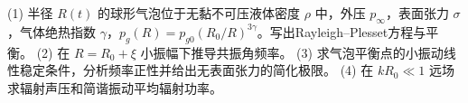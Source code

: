 (1) 半径 \(R(t)\) 的球形气泡位于无黏不可压液体密度 \(\rho\) 中，外压 \(p_\infty\)，表面张力 \(\sigma\)，气体绝热指数 \(\gamma\)，\(p_g(R)=p_{g0}(R_0/R)^{3\gamma}\)。写出Rayleigh--Plesset方程与平衡。
(2) 在 \(R=R_0+\xi\) 小振幅下推导共振角频率。
(3) 求气泡平衡点的小振动线性稳定条件，分析频率正性并给出无表面张力的简化极限。
(4) 在 \(kR_0\ll1\) 远场求辐射声压和简谐振动平均辐射功率。
